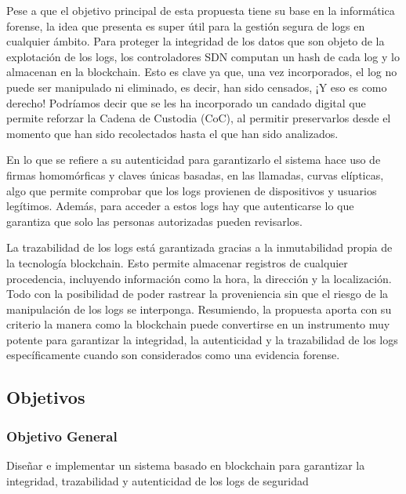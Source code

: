 Pese a que el objetivo principal de esta propuesta tiene su base en la informática forense, la idea que presenta es super útil para la gestión segura de logs en cualquier ámbito. Para proteger la integridad de los datos que son objeto de la explotación de los logs, los controladores SDN computan un hash de cada log y lo almacenan en la blockchain. Esto es clave ya que, una vez incorporados, el log no puede ser manipulado ni eliminado, es decir, han sido censados, ¡Y eso es como derecho! Podríamos decir que se les ha incorporado un candado digital que permite reforzar la Cadena de Custodia (CoC), al permitir preservarlos desde el momento que han sido recolectados hasta el que han sido analizados.

En lo que se refiere a su autenticidad para garantizarlo el sistema hace uso de firmas homomórficas y claves únicas basadas, en las llamadas, curvas elípticas, algo que permite comprobar que los logs provienen de dispositivos y usuarios legítimos. Además, para acceder a estos logs hay que autenticarse lo que garantiza que solo las personas autorizadas pueden revisarlos. 

La trazabilidad de los logs está garantizada gracias a la inmutabilidad propia de la tecnología blockchain. Esto permite almacenar registros de cualquier procedencia, incluyendo información como la hora, la dirección y la localización. Todo con la posibilidad de poder rastrear la proveniencia sin que el riesgo de la manipulación de los logs se interponga. Resumiendo, la propuesta aporta con su criterio la manera como la blockchain puede convertirse en un instrumento muy potente para garantizar la integridad, la autenticidad y la trazabilidad de los logs específicamente cuando son considerados como una evidencia forense.

\subsection{Objetivos}
\subsubsection{Objetivo General}
Diseñar e implementar un sistema basado en blockchain para garantizar la integridad, trazabilidad y autenticidad de los logs de seguridad



